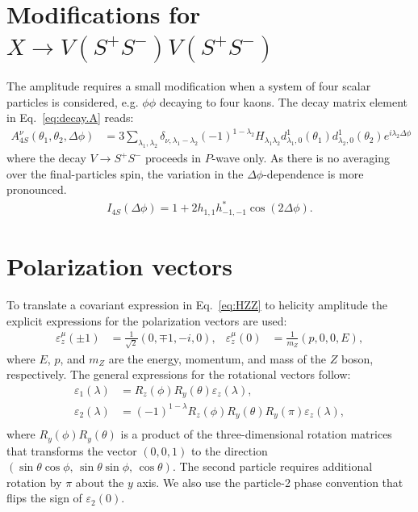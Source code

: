 \documentclass[prd,preprintnumbers,floatfix,
nofootinbib,superscriptaddress]{revtex4}
\begin{document}
\section{Modifications for $X\to V(S^+S^-)V(S^+S^-)$} \label{sec:KKKK}

The amplitude requires a small modification when a system of four scalar particles is considered,
e.g. $\phi\phi$ decaying to four kaons.
The decay matrix element in Eq.~\eqref{eq:decay.A} reads:
\begin{align}
  A^{\nu}_{4S}(\theta_1,\theta_2,\Delta\phi) &= 3
  \sum_{\lambda_1,\lambda_2}
  \delta_{\nu,\lambda_1-\lambda_2} (-1)^{1-\lambda_2}
  H_{\lambda_1\lambda_2}
  d_{\lambda_1,0}^{1}(\theta_1) d_{\lambda_2,0}^{1}(\theta_2)
  e^{i\lambda_2 \Delta\phi}
\end{align}
where the decay $V\to S^+S^-$ proceeds in $P$-wave only.
As there is no averaging over the final-particles spin,
the variation in the $\Delta\phi$-dependence is more pronounced.
\begin{align}
  I_{4S}(\Delta\phi) = 1
   + 2 h_{1,1} h_{-1,-1}^* \cos(2 \Delta\phi).
\end{align}

\section{Polarization vectors} \label{sec:polarisation.vectors}

To translate a covariant expression in Eq.~\eqref{eq:HZZ} to helicity amplitude
the explicit expressions for the polarization vectors are used:
\begin{align}
  \varepsilon_z^{\mu}(\pm1) &= \frac{1}{\sqrt{2}} \left( 0,\mp 1,-i,0 \right), &
  \varepsilon_z^{\mu}(0) &= \frac{1}{m_Z} \left(p,0,0,E\right),
\end{align}
where $E$, $p$, and $m_Z$ are the energy, momentum, and mass of the $Z$ boson, respectively.
The general expressions for the rotational vectors follow:
\begin{align}
  \varepsilon_1(\lambda) &= R_z(\phi) R_y(\theta) \varepsilon_z(\lambda),\\
  \varepsilon_2(\lambda) &= (-1)^{1-\lambda} R_z(\phi) R_y(\theta) R_y(\pi) \varepsilon_z(\lambda),\\
\end{align}
where $R_y(\phi)R_y(\theta)$ is a product of the three-dimensional rotation matrices
that transforms the vector $(0,0,1)$ to the direction $(\sin\theta\cos\phi,\,\sin\theta\sin\phi,\,\cos\theta)$.
The second particle requires additional rotation by $\pi$ about the $y$ axis.
We also use the particle-2 phase convention that flips the sign of $\varepsilon_2(0)$.
\end{document}
